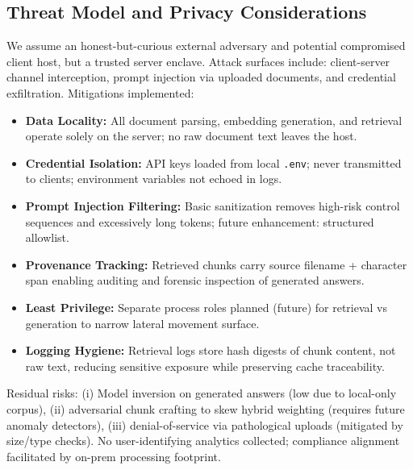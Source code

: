 \documentclass[conference]{IEEEtran}
\begin{document}
\subsection{Threat Model and Privacy Considerations}
We assume an honest-but-curious external adversary and potential compromised client host, but a trusted server enclave. Attack surfaces include: client-server channel interception, prompt injection via uploaded documents, and credential exfiltration. Mitigations implemented:
\begin{itemize}
  \item \textbf{Data Locality:} All document parsing, embedding generation, and retrieval operate solely on the server; no raw document text leaves the host.
  \item \textbf{Credential Isolation:} API keys loaded from local \texttt{.env}; never transmitted to clients; environment variables not echoed in logs.
  \item \textbf{Prompt Injection Filtering:} Basic sanitization removes high-risk control sequences and excessively long tokens; future enhancement: structured allowlist.
  \item \textbf{Provenance Tracking:} Retrieved chunks carry source filename + character span enabling auditing and forensic inspection of generated answers.
  \item \textbf{Least Privilege:} Separate process roles planned (future) for retrieval vs generation to narrow lateral movement surface.
  \item \textbf{Logging Hygiene:} Retrieval logs store hash digests of chunk content, not raw text, reducing sensitive exposure while preserving cache traceability.
\end{itemize}
Residual risks: (i) Model inversion on generated answers (low due to local-only corpus), (ii) adversarial chunk crafting to skew hybrid weighting (requires future anomaly detectors), (iii) denial-of-service via pathological uploads (mitigated by size/type checks). No user-identifying analytics collected; compliance alignment facilitated by on-prem processing footprint.
\end{document}
